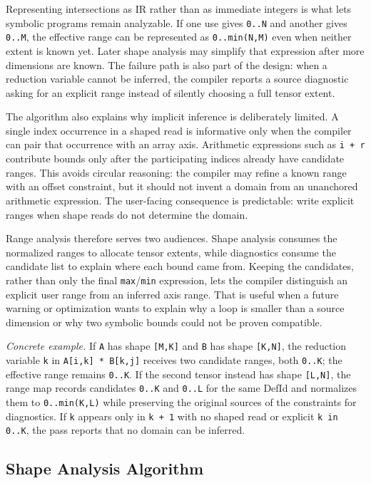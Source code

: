 Representing intersections as IR rather than as immediate integers is what
lets symbolic programs remain analyzable. If one use gives \texttt{0..N} and
another gives \texttt{0..M}, the effective range can be represented as
\texttt{0..min(N,M)} even when neither extent is known yet. Later shape
analysis may simplify that expression after more dimensions are known. The
failure path is also part of the design: when a reduction variable cannot be
inferred, the compiler reports a source diagnostic asking for an explicit
range instead of silently choosing a full tensor extent.

The algorithm also explains why implicit inference is deliberately limited. A
single index occurrence in a shaped read is informative only when the compiler
can pair that occurrence with an array axis. Arithmetic expressions such as
\texttt{i + r} contribute bounds only after the participating indices already
have candidate ranges. This avoids circular reasoning: the compiler may refine a
known range with an offset constraint, but it should not invent a domain from an
unanchored arithmetic expression. The user-facing consequence is predictable:
write explicit ranges when shape reads do not determine the domain.

Range analysis therefore serves two audiences. Shape analysis consumes the
normalized ranges to allocate tensor extents, while diagnostics consume the
candidate list to explain where each bound came from. Keeping the candidates,
rather than only the final \texttt{max}/\texttt{min} expression, lets the
compiler distinguish an explicit user range from an inferred axis range. That is
useful when a future warning or optimization wants to explain why a loop is
smaller than a source dimension or why two symbolic bounds could not be proven
compatible.

\textit{Concrete example.} If \texttt{A} has shape \texttt{[M,K]} and
\texttt{B} has shape \texttt{[K,N]}, the reduction variable \texttt{k} in
\texttt{A[i,k] * B[k,j]} receives two candidate ranges, both \texttt{0..K}; the
effective range remains \texttt{0..K}. If the second tensor instead has shape
\texttt{[L,N]}, the range map records candidates \texttt{0..K} and
\texttt{0..L} for the same DefId and normalizes them to
\texttt{0..min(K,L)} while preserving the original sources of the constraints
for diagnostics. If \texttt{k} appears only in \texttt{k + 1} with no shaped
read or explicit \texttt{k in 0..K}, the pass reports that no domain can be
inferred.

\subsection{Shape Analysis Algorithm}


